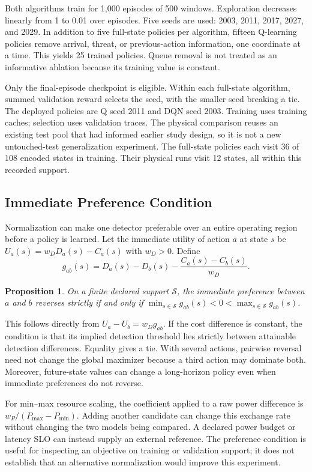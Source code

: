 \documentclass[journal]{IEEEtran}
\newtheorem{proposition}{Proposition}
\begin{document}
Both algorithms train for 1,000 episodes of 500 windows. Exploration decreases linearly from 1 to 0.01 over episodes. Five seeds are used: 2003, 2011, 2017, 2027, and 2029. In addition to five full-state policies per algorithm, fifteen Q-learning policies remove arrival, threat, or previous-action information, one coordinate at a time. This yields 25 trained policies. Queue removal is not treated as an informative ablation because its training value is constant.

Only the final-episode checkpoint is eligible. Within each full-state algorithm, summed validation reward selects the seed, with the smaller seed breaking a tie. The deployed policies are Q seed 2011 and DQN seed 2003. Training uses training caches; selection uses validation traces. The physical comparison reuses an existing test pool that had informed earlier study design, so it is not a new untouched-test generalization experiment. The full-state policies each visit 36 of 108 encoded states in training. Their physical runs visit 12 states, all within this recorded support.

\subsection{Immediate Preference Condition}\label{sec:preference}
Normalization can make one detector preferable over an entire operating region before a policy is learned. Let the immediate utility of action $a$ at state $s$ be $U_a(s)=w_DD_a(s)-C_a(s)$ with $w_D>0$. Define
\begin{equation}\label{eq:margin}
g_{ab}(s)=D_a(s)-D_b(s)-\frac{C_a(s)-C_b(s)}{w_D}.
\end{equation}
\begin{proposition}\label{prop:reversal}
On a finite declared support $\mathcal S$, the immediate preference between $a$ and $b$ reverses strictly if and only if
$\min_{s\in\mathcal S}g_{ab}(s)<0<\max_{s\in\mathcal S}g_{ab}(s)$.
\end{proposition}
This follows directly from $U_a-U_b=w_Dg_{ab}$. If the cost difference is constant, the condition is that its implied detection threshold lies strictly between attainable detection differences. Equality gives a tie. With several actions, pairwise reversal need not change the global maximizer because a third action may dominate both. Moreover, future-state values can change a long-horizon policy even when immediate preferences do not reverse.

For min--max resource scaling, the coefficient applied to a raw power difference is $w_P/(P_{\max}-P_{\min})$. Adding another candidate can change this exchange rate without changing the two models being compared. A declared power budget or latency SLO can instead supply an external reference. The preference condition is useful for inspecting an objective on training or validation support; it does not establish that an alternative normalization would improve this experiment.
\end{document}
